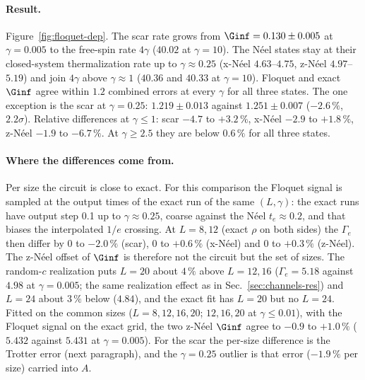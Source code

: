 \paragraph{Result.} Figure~\ref{fig:floquet-dep}. The scar rate grows from $\Ginf = 0.130 \pm 0.005$ at $\gamma = 0.005$ to the free-spin rate $4\gamma$ ($40.02$ at $\gamma = 10$). The Néel states stay at their closed-system thermalization rate up to $\gamma \approx 0.25$ (x-Néel $4.63$--$4.75$, z-Néel $4.97$--$5.19$) and join $4\gamma$ above $\gamma \approx 1$ ($40.36$ and $40.33$ at $\gamma = 10$). Floquet and exact $\Ginf$ agree within $1.2$ combined errors at every $\gamma$ for all three states. The one exception is the scar at $\gamma = 0.25$: $1.219 \pm 0.013$ against $1.251 \pm 0.007$ ($-2.6\,\%$, $2.2\sigma$). Relative differences at $\gamma \le 1$: scar $-4.7$ to $+3.2\,\%$, x-Néel $-2.9$ to $+1.8\,\%$, z-Néel $-1.9$ to $-6.7\,\%$. At $\gamma \ge 2.5$ they are below $0.6\,\%$ for all three states.

\paragraph{Where the differences come from.} Per size the circuit is close to exact. For this comparison the Floquet signal is sampled at the output times of the exact run of the same $(L, \gamma)$: the exact runs have output step 0.1 up to $\gamma \approx 0.25$, coarse against the Néel $t_e \approx 0.2$, and that biases the interpolated $1/e$ crossing. At $L = 8, 12$ (exact $\rho$ on both sides) the $\Gamma_e$ then differ by $0$ to $-2.0\,\%$ (scar), $0$ to $+0.6\,\%$ (x-Néel) and $0$ to $+0.3\,\%$ (z-Néel). The z-Néel offset of $\Ginf$ is therefore not the circuit but the set of sizes. The random-$c$ realization puts $L = 20$ about $4\,\%$ above $L = 12, 16$ ($\Gamma_e = 5.18$ against $4.98$ at $\gamma = 0.005$; the same realization effect as in Sec.~\ref{sec:channels-res}) and $L = 24$ about $3\,\%$ below ($4.84$), and the exact fit has $L = 20$ but no $L = 24$. Fitted on the common sizes ($L = 8, 12, 16, 20$; $12, 16, 20$ at $\gamma \le 0.01$), with the Floquet signal on the exact grid, the two z-Néel $\Ginf$ agree to $-0.9$ to $+1.0\,\%$ ($5.432$ against $5.431$ at $\gamma = 0.005$). For the scar the per-size difference is the Trotter error (next paragraph), and the $\gamma = 0.25$ outlier is that error ($-1.9\,\%$ per size) carried into $A$.

